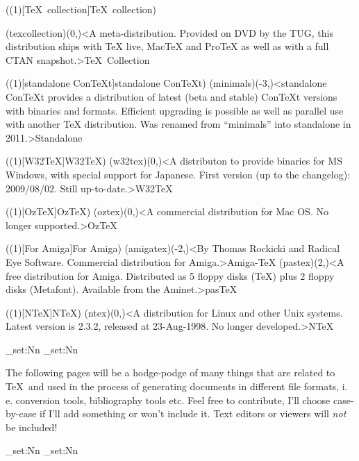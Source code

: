 \tograph(\tostruct(1)[\TeX\ collection]{\TeX\ collection}){
	\tonode(texcollection)(0,\layer)<A meta-distribution. Provided on DVD by the TUG, this distribution ships with TeX live, MacTeX and ProTeX as well as with a full CTAN snapshot.>{\TeX\ Collection}

}

\tograph(\tostruct(1)[standalone Con\TeX t]{standalone Con\TeX t}){
	\tonode(minimals)(-3,\layer)<standalone ConTeXt provides a distribution of latest (beta and stable) ConTeXt versions with binaries and formats. Efficient upgrading is possible as well as parallel use with another TeX distribution. Was renamed from “minimals” into standalone in 2011.>{Standalone}
}

\tograph(\tostruct(1)[W32\TeX]{W32\TeX}){
	\tonode(w32tex)(0,\layer)<A distributon to provide binaries for MS Windows, with special support for Japanese. First version (up to the changelog): 2009/08/02. Still up-to-date.>{W32\TeX}
}

\tograph(\tostruct(1)[OzTeX]{OzTeX}){
	\tonode[\histdistro](oztex)(0,\layer)<A commercial distribution for Mac OS. No longer supported.>{Oz\TeX}
}

\tograph(\tostruct(1)[For Amiga]{For Amiga}){
	\tonode[\histdistro](amigatex)(-2,\layer)<By Thomas Rockicki and Radical Eye Software. Commercial distribution for Amiga.>{Amiga-TeX}
	\tonode[\histdistro](pastex)(2,\layer)<A free distribution for Amiga. Distributed as 5 floppy disks (TeX) plus 2 floppy disks (Metafont). Available from the Aminet.>{pasTeX}
}

\tograph(\tostruct(1)[N\TeX]{N\TeX}){
	\tonode[\histdistro](ntex)(0,\layer)<A distribution for Linux and other Unix systems. Latest version is 2.3.2, released at 23-Aug-1998. No longer developed.>{N\TeX}
}

\newpage
\ExplSyntaxOn
  \dim_set:Nn\pdfpagewidth{13cm}       %
  \dim_set:Nn\pdfpageheight{6cm}
\ExplSyntaxOff
\newpage
{}
\parbox{\textwidth}{\normalsize
The following pages will be a hodge-podge of many things that are related to \TeX\ and used in the process of generating documents in different file formats, i.\,e. conversion tools, bibliography tools etc. Feel free to contribute, I'll choose case-by-case if I'll add something or won't include it. Text editors or viewers will \emph{not} be included!
}
  \restoregeometry
\ExplSyntaxOn
  \dim_set:Nn\pdfpagewidth{21cm}     %
  \dim_set:Nn\pdfpageheight{29.7cm}
\ExplSyntaxOff

